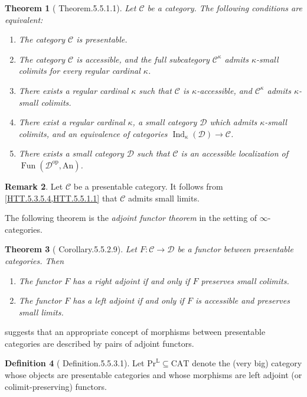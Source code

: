 \documentclass[a4paper,dvipdfmx,11pt,reqno]{amsart}
\DeclareMathOperator{\myop}{op}
\DeclareMathOperator{\Fun}{Fun}
\DeclareMathOperator{\Ind}{Ind}
\newcommand{\C}{\mathcal{C}}
\newcommand{\D}{\mathcal{D}}
\newcommand{\An}{\mathrm{An}}
\newcommand{\CAT}{\mathrm{CAT}}
\newcommand{\PrL}{\mathrm{Pr}^{\mathrm{L}}}
\newtheorem{theorem}{Theorem}[section]
\theoremstyle{definition}
\newtheorem{definition}[theorem]{Definition}
\newtheorem{remark}[theorem]{Remark}
\begin{document}
\begin{theorem}[\cite{HTT} Theorem.5.5.1.1] \label{HTT.5.5.1.1}
  Let $\C$ be a category.
  The following conditions are equivalent:
  \begin{enumerate}
    \item The category $\C$ is presentable.
    \item The category $\C$ is accessible, and the full subcategory $\C^{\kappa}$ admits $\kappa$-small colimits for every regular cardinal $\kappa$.
    \item There exists a regular cardinal $\kappa$ such that $\C$ is $\kappa$-accessible, and $\C^{\kappa}$ admits $\kappa$-small colimits.
    \item There exist a regular cardinal $\kappa$, a small category $\D$ which admits $\kappa$-small colimits, and an equivalence of categories $\Ind_{\kappa}(\D) \to \C$.
    \item There exists a small category $\D$ such that $\C$ is an accessible localization of $\Fun(\D^{\myop},\An)$.
  \end{enumerate}
\end{theorem}

\begin{remark}
  Let $\C$ be a presentable category.
  It follows from \cref{HTT.5.3.5.4,HTT.5.5.1.1} that $\C$ admits small limits.  
\end{remark}

The following theorem is the \textit{adjoint functor theorem} in the setting of $\infty$-categories.

\begin{theorem}[\cite{HTT} Corollary.5.5.2.9] \label{HTT.5.5.2.9}
  Let $F : \C \to \D$ be a functor between presentable categories. 
  Then
  \begin{enumerate}
    \item The functor $F$ has a right adjoint if and only if $F$ preserves small colimits.
    \item The functor $F$ has a left adjoint if and only if $F$ is accessible and preserves small limits.
  \end{enumerate}
\end{theorem}

 suggests that an appropriate concept of morphisms between presentable categories are described by pairs of adjoint functors.

\begin{definition}[\cite{HTT} Definition.5.5.3.1]
  Let $\PrL \subseteq \CAT$ denote the (very big) category whose objects are presentable categories and whose morphisms are left adjoint (or colimit-preserving) functors.
\end{definition}
\end{document}
